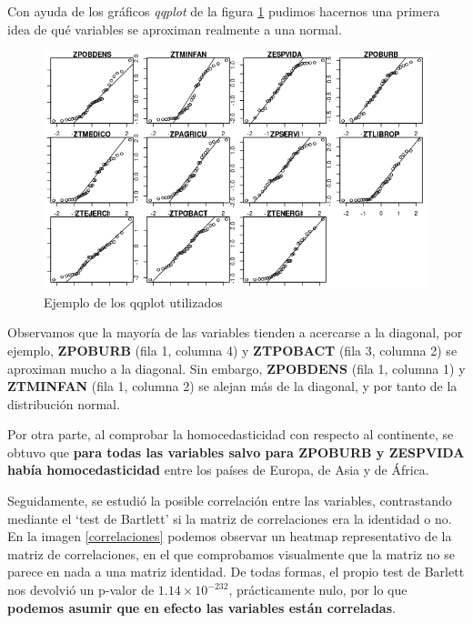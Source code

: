 \documentclass[letterpaper,11pt]{article}
\begin{document}
Con ayuda de los gráficos \textit{qqplot} de la figura \ref{qqplot} pudimos hacernos una primera idea de qué variables se aproximan realmente a una normal.

\newpage

\begin{figure}[h]
\begin{center}
\includegraphics[scale=0.5]{./img/qq.png}
\end{center}
\caption{Ejemplo de los qqplot utilizados}
\label{qqplot}
\end{figure}

Observamos que la mayoría de las variables tienden a acercarse a la diagonal, por ejemplo, \textbf{ZPOBURB} (fila 1, columna 4) y \textbf{ZTPOBACT} (fila 3, columna 2) se aproximan mucho a la diagonal. Sin embargo, \textbf{ZPOBDENS} (fila 1, columna 1) y \textbf{ZTMINFAN} (fila 1, columna 2) se alejan más de la diagonal, y por tanto de la distribución normal.

Por otra parte, al comprobar la homocedasticidad con respecto al continente, se obtuvo que \textbf{para todas las variables salvo para ZPOBURB y ZESPVIDA había homocedasticidad} entre los países de Europa, de Asia y de África.

Seguidamente, se estudió la posible correlación entre las variables, contrastando mediante el `test de Bartlett' si la matriz de correlaciones era la identidad o no. En la imagen \ref{correlaciones} podemos observar un heatmap representativo de la matriz de correlaciones, en el que comprobamos visualmente que la matriz no se parece en nada a una matriz identidad. De todas formas, el propio test de Barlett nos devolvió un p-valor de $1.14\times 10^{-232}$, prácticamente nulo, por lo que \textbf{podemos asumir que en efecto las variables están correladas}.
\end{document}

